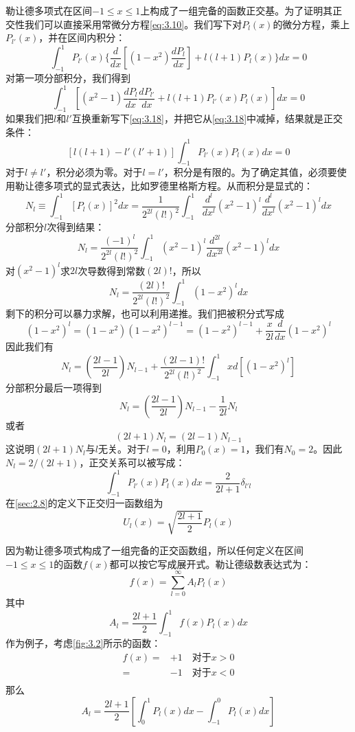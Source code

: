 \documentclass[12pt]{book}
\numberwithin{equation}{chapter}
\numberwithin{figure}{chapter}
\numberwithin{footnote}{page}
\begin{document}
勒让德多项式在区间$-1\leq x\leq 1$上构成了一组完备的函数正交基。为了证明其正交性我们可以直接采用常微分方程\autoref{eq:3.10}。我们写下对$P_l(x)$的微分方程，乘上$P_{l'}(x)$，并在区间内积分：
\begin{equation}\label{eq:3.17}
    \int_{-1}^1 P_{l'}(x)\{\frac{d}{dx}[(1-x^2)\frac{dP_l}{dx}]+l(l+1)P_l(x)\}dx=0
\end{equation}
对第一项分部积分，我们得到
\begin{equation}\label{eq:3.18}
    \int_{-1}^1 [(x^2-1)\frac{dP_l}{dx}\frac{dP_{l'}}{dx}+l(l+1)P_{l'}(x)P_l(x)]dx=0
\end{equation}
如果我们把$l$和$l'$互换重新写下\autoref{eq:3.18}，并把它从\autoref{eq:3.18}中减掉，结果就是正交条件：
\begin{equation}\label{eq:3.19}
    [l(l+1)-l'(l'+1)]\int_{-1}^1 P_{l'}(x)P_l(x)dx=0
\end{equation}
对于$l\neq l'$，积分必须为零。对于$l=l'$，积分是有限的。为了确定其值，必须要使用勒让德多项式的显式表达，比如罗德里格斯方程。从而积分是显式的：
$$N_l\equiv\int_{-1}^1 [P_l(x)]^2dx=\frac{1}{2^{2l}(l!)^2}\int_{-1}^1 \frac{d^l}{dx^l}(x^2-1)^l \frac{d^l}{dx^l}(x^2-1)^l dx$$
分部积分$l$次得到结果：
$$N_l=\frac{(-1)^l}{2^{2l}(l!)^2}\int_{-1}^1 (x^2-1)^l \frac{d^{2l}}{dx^{2l}}(x^2-1)^l dx$$
对$(x^2-1)^l$求$2l$次导数得到常数$(2l)!$，所以
$$N_l=\frac{(2l)!}{2^{2l}(l!)^2}\int_{-1}^1 (1-x^2)^l dx$$
剩下的积分可以暴力求解，也可以利用递推。我们把被积分式写成
$$(1-x^2)^l=(1-x^2)(1-x^2)^{l-1}=(1-x^2)^{l-1}+\frac{x}{2l}\frac{d}{dx}(1-x^2)^l$$
因此我们有
$$N_l=(\frac{2l-1}{2l})N_{l-1}+\frac{(2l-1)!}{2^{2l}(l!)^2}\int_{-1}^1 x d[(1-x^2)^l]$$
分部积分最后一项得到
$$N_l=(\frac{2l-1}{2l})N_{l-1}-\frac{1}{2l}N_l$$
或者
\begin{equation}\label{eq:3.20}
    (2l+1)N_l=(2l-1)N_{l-1}
\end{equation}
这说明$(2l+1)N_l$与$l$无关。对于$l=0$，利用$P_0(x)=1$，我们有$N_0=2$。因此$N_l=2/(2l+1)$，正交关系可以被写成：
\begin{equation}\label{eq:3.21}
    \int_{-1}^1 P_{l'}(x)P_l(x)dx=\frac{2}{2l+1}\delta_{l'l}
\end{equation}
在\autoref{sec:2.8}的定义下正交归一函数组为
\begin{equation}\label{eq:3.22}
    U_l(x)=\sqrt{\frac{2l+1}{2}}P_l(x)
\end{equation}

因为勒让德多项式构成了一组完备的正交函数组，所以任何定义在区间$-1\leq x\leq 1$的函数$f(x)$都可以按它写成展开式。勒让德级数表达式为：
\begin{equation}\label{eq:3.23}
    f(x)=\sum_{l=0}^\infty A_lP_l(x)
\end{equation}
其中
\begin{equation}\label{eq:3.24}
    A_l=\frac{2l+1}{2}\int_{-1}^1 f(x)P_l(x)dx
\end{equation}
作为例子，考虑\autoref{fig:3.2}所示的函数：
$$\begin{aligned}
    f(x)=&+1\quad \mbox{对于}x>0\\
    =&-1\quad \mbox{对于}x<0\\
\end{aligned}$$
那么
$$A_l=\frac{2l+1}{2}[\int_0^1 P_l(x)dx-\int_{-1}^0 P_l(x)dx]$$
\end{document}
